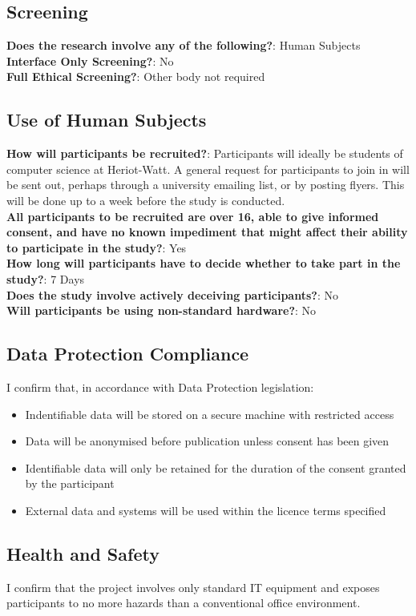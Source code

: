 \documentclass[a4paper,11pt]{report}
\begin{document}
\subsection*{Screening}
\textbf{Does the research involve any of the following?}: Human Subjects\\
\textbf{Interface Only Screening?}: No\\
\textbf{Full Ethical Screening?}: Other body not required

\subsection*{Use of Human Subjects}
\textbf{How will participants be recruited?}: Participants will ideally be students of computer science at Heriot-Watt. A general request for participants to join in will be sent out, perhaps through a university emailing list, or by posting flyers. This will be done up to a week before the study is conducted.\\
\textbf{All participants to be recruited are over 16, able to give informed consent, and have no known impediment that might affect their ability to participate in the study?}: Yes\\
\textbf{How long will participants have to decide whether to take part in the study?}: 7 Days\\
\textbf{Does the study involve actively deceiving participants?}: No\\
\textbf{Will participants be using non-standard hardware?}: No

\subsection*{Data Protection Compliance}
I confirm that, in accordance with Data Protection legislation:
\begin{itemize}
\item Indentifiable data will be stored on a secure machine with restricted access
\item Data will be anonymised before publication unless consent has been given
\item Identifiable data will only be retained for the duration of the consent granted by the participant
\item External data and systems will be used within the licence terms specified
\end{itemize}

\subsection*{Health and Safety}
I confirm that the project involves only standard IT equipment and exposes participants to no more hazards than a conventional office environment.
\end{document}
